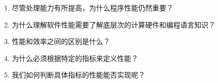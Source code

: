 \begin{enumerate}
\item 尽管处理能力有所提高，为什么程序性能仍然重要？
\item 为什么理解软件性能需要了解底层次的计算硬件和编程语言知识？
\item 性能和效率之间的区别是什么？
\item 为什么必须根据特定的指标来定义性能？
\item 我们如何判断具体指标的性能能否实现呢？
\end{enumerate}
